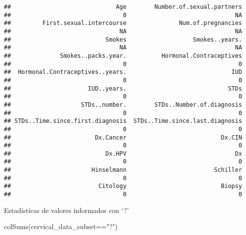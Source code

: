 \documentclass[
]{article}
\newenvironment{Shaded}{\begin{snugshade}}{\end{snugshade}}
\newcommand{\FunctionTok}[1]{\textcolor[rgb]{0.94,0.94,0.56}{#1}}
\newcommand{\NormalTok}[1]{\textcolor[rgb]{0.80,0.80,0.80}{#1}}
\newcommand{\SpecialCharTok}[1]{\textcolor[rgb]{0.86,0.64,0.64}{#1}}
\newcommand{\StringTok}[1]{\textcolor[rgb]{0.80,0.58,0.58}{#1}}
\begin{document}
\begin{verbatim}
##                              Age        Number.of.sexual.partners 
##                                0                               NA 
##         First.sexual.intercourse               Num.of.pregnancies 
##                               NA                               NA 
##                           Smokes                   Smokes..years. 
##                               NA                               NA 
##              Smokes..packs.year.          Hormonal.Contraceptives 
##                                0                                0 
##  Hormonal.Contraceptives..years.                              IUD 
##                                0                                0 
##                      IUD..years.                             STDs 
##                                0                                0 
##                    STDs..number.        STDs..Number.of.diagnosis 
##                                0                                0 
## STDs..Time.since.first.diagnosis  STDs..Time.since.last.diagnosis 
##                                0                                0 
##                        Dx.Cancer                           Dx.CIN 
##                                0                                0 
##                           Dx.HPV                               Dx 
##                                0                                0 
##                       Hinselmann                         Schiller 
##                                0                                0 
##                         Citology                           Biopsy 
##                                0                                0
\end{verbatim}

Estadísticas de valores informados con `?'

\begin{Shaded}
\begin{Highlighting}[]
\FunctionTok{colSums}\NormalTok{(cervical\_data\_subset}\SpecialCharTok{==}\StringTok{"?"}\NormalTok{)}
\end{Highlighting}
\end{Shaded}
\end{document}
